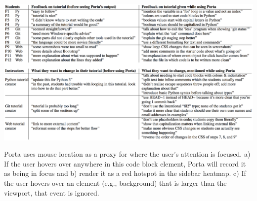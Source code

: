 \begin{table}[h!]
  \label{tab:study-feedback}
  \includegraphics[width=\linewidth]{figures/porta/tbl_feedback.png}
  \caption{Porta uses mouse location as a proxy for where the user's
    attention is focused. a) If the user hovers over anywhere in this code
    block element, Porta will record it as being in focus and b) render it
    as a red hotspot in the sidebar heatmap. c) If the user hovers over an
    element (e.g., background) that is larger than the viewport, that event
    is ignored.}
\end{table}



%


